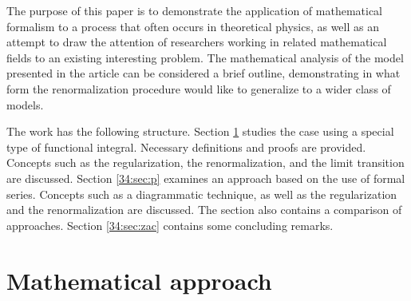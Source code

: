 \documentclass[a4paper]{article}
\begin{document}
The purpose of this paper is to demonstrate the application of mathematical formalism to a process that often occurs in theoretical physics, as well as an attempt to draw the attention of researchers working in related mathematical fields to an existing interesting problem. The mathematical analysis of the model presented in the article can be considered a brief outline, demonstrating in what form the renormalization procedure would like to generalize to a wider class of models.

The work has the following structure. Section \ref{34:sec:m} studies the case using a special type of functional integral. Necessary definitions and proofs are provided. Concepts such as the regularization, the renormalization, and the limit transition are discussed. Section \ref{34:sec:p} examines an approach based on the use of formal series. Concepts such as a diagrammatic technique, as well as the regularization and the renormalization are discussed. The section also contains a comparison of approaches. Section \ref{34:sec:zac} contains some concluding remarks.

\section{Mathematical approach}
\label{34:sec:m}
\end{document}
